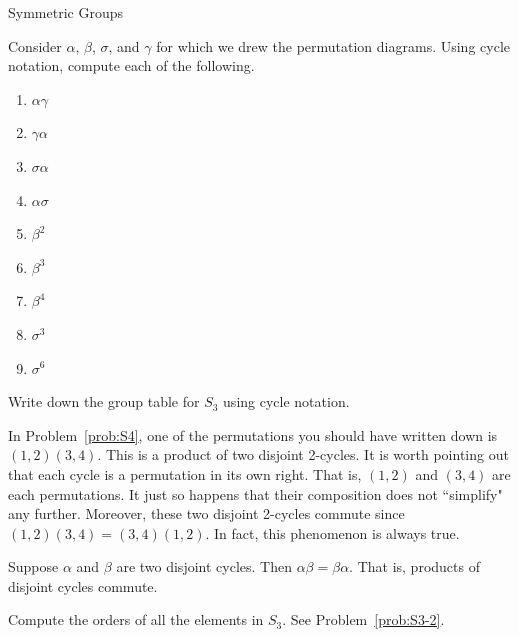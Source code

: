 \begin{section}{Symmetric Groups}
\begin{problem}
Consider $\alpha$, $\beta$, $\sigma$, and $\gamma$ for which we drew the permutation diagrams.  Using cycle notation, compute each of the following.
\begin{multicols}{2}
\begin{enumerate}[label=\textrm{(\alph*)}]
\item $\alpha\gamma$
\item $\gamma\alpha$
\item $\sigma\alpha$
\item $\alpha\sigma$
\item $\beta^2$
\item $\beta^3$
\item $\beta^4$
\item $\sigma^3$
\item $\sigma^6$
\end{enumerate}
\end{multicols}
\end{problem}

\begin{problem}
Write down the group table for $S_3$ using cycle notation.
\end{problem}

In Problem~\ref{prob:S4}, one of the permutations you should have written down is $(1,2)(3,4)$.  This is a product of two disjoint 2-cycles.  It is worth pointing out that each cycle is a permutation in its own right.  That is, $(1,2)$ and $(3,4)$ are each permutations.  It just so happens that their composition does not ``simplify" any further.  Moreover, these two disjoint 2-cycles commute since $(1,2)(3,4)=(3,4)(1,2)$.  In fact, this phenomenon is always true.

\begin{theorem}
Suppose $\alpha$ and $\beta$ are two disjoint cycles.  Then $\alpha\beta=\beta\alpha$.  That is, products of disjoint cycles commute.
\end{theorem}

\begin{problem}
Compute the orders of all the elements in $S_3$.  See Problem~\ref{prob:S3-2}.
\end{problem}


\end{section}
